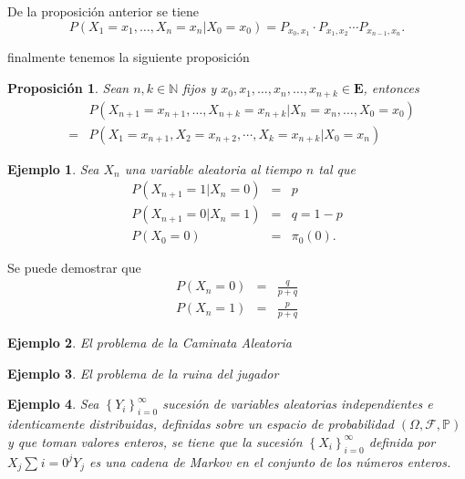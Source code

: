 \documentclass{article}
\newtheorem{Ejem}{Ejemplo}
\newtheorem{Prop}{Proposición}
\newcommand{\nat}{\mathbb{N}}
\newcommand{\Eb}{\mathbf{E}}
\newcommand{\prob}{\mathbb{P}}
\begin{document}
De la proposición anterior se tiene
\begin{equation}
P\left(X_{1}=x_{1},\ldots,X_{n}=x_{n}|X_{0}=x_{0}\right)=P_{x_{0},x_{1}}\cdot P_{x_{1},x_{2}}\cdots P_{x_{n-1},x_{n}}.
\end{equation}

finalmente tenemos la siguiente proposición

\begin{Prop}
Sean $n,k\in\nat$ fijos y $x_{0},x_{1},\ldots,x_{n},\ldots,x_{n+k}\in\Eb$, entonces
\begin{eqnarray*}
&&P\left(X_{n+1}=x_{n+1},\ldots,X_{n+k}=x_{n+k}|X_{n}=x_{n},\ldots,X_{0}=x_{0}\right)\\
&=&P\left(X_{1}=x_{n+1},X_{2}=x_{n+2},\cdots,X_{k}=x_{n+k}|X_{0}=x_{n}\right)
\end{eqnarray*}
\end{Prop}


\begin{Ejem}
Sea $X_{n}$ una variable aleatoria al tiempo $n$ tal que
\begin{eqnarray}
P\left(X_{n+1}=1|X_{n}=0\right)&=&p\\
P\left(X_{n+1}=0|X_{n}=1\right)&=&q=1-p\\
P\left(X_{0}=0\right)&=&\pi_{0}\left(0\right).
\end{eqnarray}
\end{Ejem}
Se puede demostrar que
\begin{eqnarray}
P\left(X_{n}=0\right)&=&\frac{q}{p+q}\\
P\left(X_{n}=1\right)&=&\frac{p}{p+q}
\end{eqnarray}

\begin{Ejem}
El problema de la Caminata Aleatoria
\end{Ejem}

\begin{Ejem}
El problema de la ruina del jugador
\end{Ejem}

\begin{Ejem}
Sea $\left\{Y_{i}\right\}_{i=0}^{\infty}$ sucesión de variables aleatorias independientes e identicamente distribuidas, definidas sobre un espacio de probabilidad $\left(\Omega,\mathcal{F},\prob\right)$ y que toman valores enteros, se tiene que la sucesión $\left\{X_{i}\right\}_{i=0}^{\infty}$ definida por $X_{j}\sum_{}i=0^{j}Y_{j}$ es una cadena de Markov en el conjunto de los números enteros.
\end{Ejem}
\end{document}
